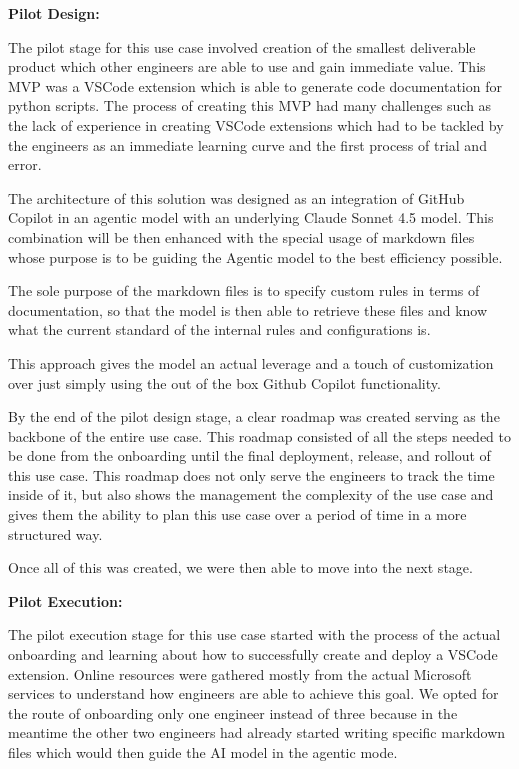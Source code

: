 \documentclass[]{imc-inf}
\begin{document}
\textbf{Pilot Design:}

The pilot stage for this use case involved creation of the smallest deliverable product which other engineers are able to use and gain immediate value. This MVP was a VSCode extension which is able to generate code documentation for python scripts. The process of creating this MVP had many challenges such as the lack of experience in creating VSCode extensions which had to be tackled by the engineers as an immediate learning curve and the first process of trial and error. 

The architecture of this solution was designed as an integration of GitHub Copilot in an agentic model with an underlying Claude Sonnet 4.5 model. This combination will be then enhanced with the special usage of markdown files whose purpose is to be guiding the Agentic model to the best efficiency possible. 

The sole purpose of the markdown files is to specify custom rules in terms of documentation, so that the model is then able to retrieve these files and know what the current standard of the internal rules and configurations is. 

This approach gives the model an actual leverage and a touch of customization over just simply using the out of the box Github Copilot functionality.


By the end of the pilot design stage, a clear roadmap was created serving as the backbone of the entire use case. This roadmap consisted of all the steps needed to be done from the onboarding until the final deployment, release, and rollout of this use case. This roadmap does not only serve the engineers to track the time inside of it, but also shows the management the complexity of the use case and gives them the ability to plan this use case over a period of time in a more structured way.

Once all of this was created, we were then able to move into the next stage. 

\textbf{Pilot Execution:}

The pilot execution stage for this use case started with the process of the actual onboarding and learning about how to successfully create and deploy a VSCode extension. Online resources were gathered mostly from the actual Microsoft services to understand how engineers are able to achieve this goal. We opted for the route of onboarding only one engineer instead of three because in the meantime the other two engineers had already started writing specific markdown files which would then guide the AI model in the agentic mode. 
\end{document}
